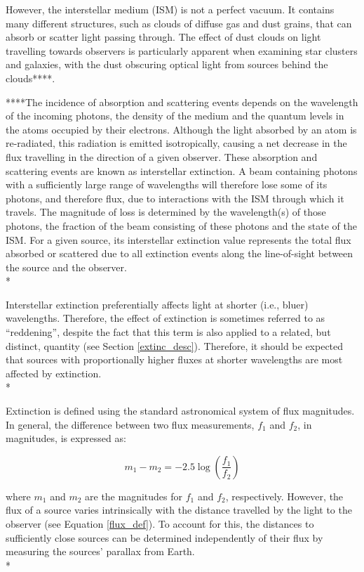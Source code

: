\documentclass[12pt, a4paper]{report}
\begin{document}
However, the interstellar medium (ISM) is not a perfect vacuum. It contains many different structures, such as clouds of diffuse gas and dust grains, that can absorb or scatter light passing through. The effect of dust clouds on light travelling towards observers is particularly apparent when examining star clusters and galaxies, with the dust obscuring optical light from sources behind the clouds****.


****The incidence of absorption and scattering events depends on the wavelength of the incoming photons, the density of the medium and the quantum levels in the atoms occupied by their electrons. Although the light absorbed by an atom is re-radiated, this radiation is emitted isotropically, causing a net decrease in the flux travelling in the direction of a given observer. These absorption and scattering events are known as interstellar extinction. A beam containing photons with a sufficiently large range of wavelengths will therefore lose some of its photons, and therefore flux, due to interactions with the ISM through which it travels. The magnitude of loss is determined by the wavelength(s) of those photons, the fraction of the beam consisting of these photons and the state of the ISM. For a given source, its interstellar extinction value represents the total flux absorbed or scattered due to all extinction events along the line-of-sight between the source and the observer.\\*

Interstellar extinction preferentially affects light at shorter (i.e., bluer) wavelengths. Therefore, the effect of extinction is sometimes referred to as ``reddening'', despite the fact that this term is also applied to a related, but distinct, quantity (see Section \ref{extinc_desc}). Therefore, it should be expected that sources with proportionally higher fluxes at shorter wavelengths are most affected by extinction. \\*

Extinction is defined using the standard astronomical system of flux magnitudes. In general, the difference between two flux measurements, $f_{1}$ and $f_{2}$, in magnitudes, is expressed as:

\begin{equation}
\label{mags_def}
m_{1} - m_{2} = -2.5\log \left( \frac{f_{1}}{f_{2}} \right)
\end{equation}

where $m_{1}$ and $m_{2}$ are the magnitudes for $f_{1}$ and $f_{2}$, respectively. However, the flux of a source varies intrinsically with the distance travelled by the light to the observer (see Equation \ref{flux_def}). To account for this, the distances to sufficiently close sources can be determined independently of their flux by measuring the sources' parallax from Earth. \\*
\end{document}
